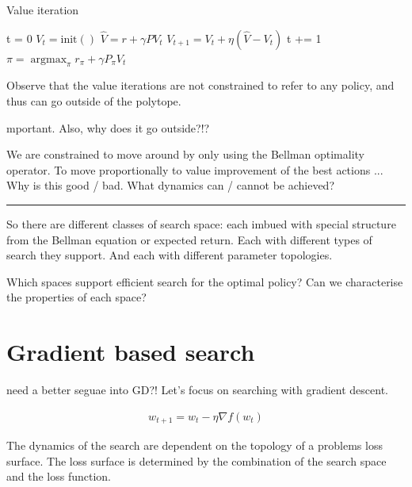 \begin{algorithm}
\caption{Value iteration}
\begin{algorithmic}[1]

  \State t = 0
  \State $V_t = \text{init}()$
    \State $\hat V = r + \gamma PV_t$ 
    \State $V_{t+1} = V_t + \eta (\hat V - V_t)$ 
    \State t += 1
  \EndWhile
  \State $\pi = \mathop{\text{argmax}}_{\pi} r_{\pi} + \gamma P_{\pi}V_t$
  \State \algorithmicreturn{ $\pi$}
\EndProcedure

\end{algorithmic}
\end{algorithm}



Observe that the value iterations are not constrained to refer to any policy,
and thus can go outside of the polytope. \cite{Dadashi2018}

{\color{red}mportant. Also, why does it go outside?!?}

We are constrained to move around by only using the Bellman optimality operator.
To move proportionally to value improvement of the best actions ...
Why is this good / bad. What dynamics can / cannot be achieved?

\begin{center}\rule{0.5\linewidth}{\linethickness}\end{center}

So there are different classes of search space: each imbued with special
structure from the Bellman equation or expected return. Each with different types of search they
support. And each with different parameter topologies.

Which spaces support efficient search for the optimal policy? Can we characterise the properties of each space?

\section{Gradient based search}

{\color{red}need a better seguae into GD?!}
Let's focus on searching with gradient descent.

\begin{align}
w_{t+1} = w_t - \eta \nabla f(w_t)
\end{align}

The dynamics of the search are dependent on the topology of a problems loss surface.
The loss surface is determined by the combination of the search space and the loss function.

